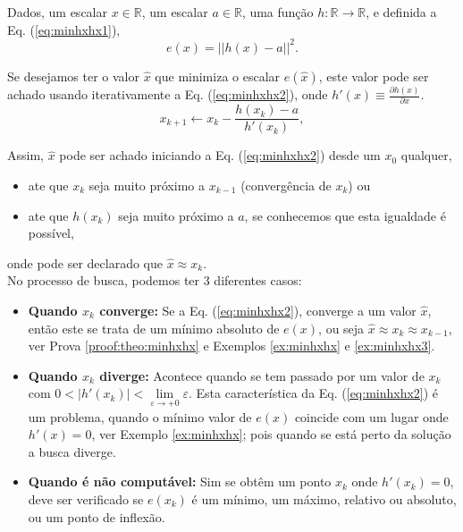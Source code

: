 \begin{theorem}\label{theo:minhxhx}
Dados,
um escalar $x \in \mathbb{R}$, 
um escalar $a \in \mathbb{R}$,  
uma função $h:\mathbb{R} \rightarrow \mathbb{R}$, e 
definida a Eq. (\ref{eq:minhxhx1}),
\begin{equation}\label{eq:minhxhx1}
e(x)=||h(x)-a||^2.
\end{equation}

Se desejamos ter o valor $\hat{x}$ que minimiza o escalar $e(\hat{x})$,
este valor pode ser achado usando iterativamente a Eq. (\ref{eq:minhxhx2}),
onde  $h'(x)\equiv \frac{\partial h(x)}{\partial x}$.
\begin{equation}\label{eq:minhxhx2}
x_{k+1} \leftarrow x_k-
\frac{ h(x_k)-a}{h'(x_k)},
\end{equation}


Assim, $\hat{x}$ pode ser achado iniciando a Eq. (\ref{eq:minhxhx2}) desde um 
$x_{0}$ qualquer, 
\begin{itemize}
    \item ate que $x_{k}$ seja muito próximo a $x_{k-1}$ (convergência de $x_{k}$) ou
    \item ate que $h(x_{k})$ seja muito próximo a $a$, 
    se conhecemos que esta igualdade é possível,
\end{itemize}
onde pode ser declarado que $\hat{x} \approx x_{k}$.\\

No processo de busca, podemos ter 3 diferentes casos:
\begin{itemize}
\item \textbf{Quando $x_{k}$ converge:}  
Se a Eq. (\ref{eq:minhxhx2}),  converge a um valor $\hat{x}$, então este se trata de 
um mínimo absoluto de
$e(x)$, ou seja $\hat{x}\approx x_k\approx x_{k-1}$, ver Prova \ref{proof:theo:minhxhx} e Exemplos \ref{ex:minhxhx} e \ref{ex:minhxhx3}.

\item \textbf{Quando $x_{k}$ diverge:}  
Acontece quando se tem passado por
um valor de $x_k$ com $0 <|h'(x_k) | < \lim\limits_{\varepsilon \rightarrow +0}\varepsilon$. 
Esta característica da Eq. (\ref{eq:minhxhx2}) é um problema, quando o mínimo valor de $e(x)$ coincide
com um lugar onde $h'(x) = 0$, ver Exemplo \ref{ex:minhxhx}; pois quando se está perto
da solução a busca diverge.

\item \textbf{Quando é não computável:} 
Sim se obtêm um ponto $x_k$ onde $h'(x_k) = 0$,
deve ser verificado se $e(x_k)$ é um mínimo, um
máximo, relativo ou absoluto, ou um ponto de inflexão. \\
\end{itemize}


\end{theorem}
